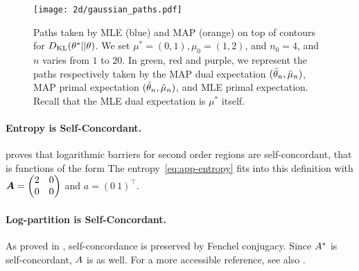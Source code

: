 \begin{subappendices}
\begin{figure}[ht]
	\centering
	\texttt{[image: 2d/gaussian\_paths.pdf]}
	\caption[MLE and MAP sample trajectories for a Gaussian.]{
		Paths taken by MLE (blue) and MAP (orange) on top of contours for $D_{\mathrm{KL}}(\theta^* || \theta)$. 
		We set $\mu^*=(0, 1), \mu_0 = (1, 2)$, and $n_0=4$, and $n$ varies from $1$ to $20$.
		In green, red and purple, we represent the paths respectively taken by the MAP dual expectation  $(\bar{\theta}_n, \bar \mu_n)$, MAP primal expectation $(\tilde{\theta}_n,\tilde\mu_n)$, and MLE primal expectation. Recall that the MLE dual expectation is $\mu^*$ itself.
	}
	\label{fig:gaussian-paths}
\end{figure}


\paragraph{Entropy is Self-Concordant.}
\citet[Example 4.1.1.4,   p.177]{nesterov2003introductory} proves that logarithmic barriers for second order regions are self-concordant, 
that is functions of the form 
The entropy~\eqref{eq:app-entropy} fits into this definition with ${\bm{A}} = \begin{pmatrix} 2 & 0 \\ 0 & 0 \end{pmatrix}$ and $a = ( 0 \ 1 )^\top$.

\paragraph{Log-partition is Self-Concordant.}
As proved in \citet{nesterov1994interior}, self-concordance is preserved by Fenchel conjugacy.
Since ${A^*}$ is self-concordant, $A$ is as well.
For a more accessible reference, see also \citet[Prop.~6]{sun2019generalized}.


\end{subappendices}
